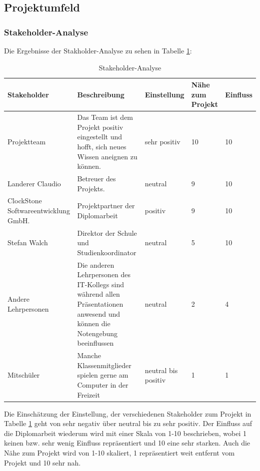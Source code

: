 \subsection{Projektumfeld}
\def \currentAuthor {Lukas Vogel} %
\subsubsection{Stakeholder-Analyse}
Die Ergebnisse der Stakholder-Analyse zu sehen in Tabelle \ref{Stakeholder-Analyse}:
\begin{table}[H]
		
	\renewcommand{\arraystretch}{1.5}
		\begin{tabular}{|p{3cm}|p{6cm}|p{3cm}|p{1.5cm}|p{1.5cm}|}
			\hline
			\textbf{Stakeholder} & \textbf{Beschreibung} & \textbf{Einstellung} & \textbf{Nähe zum Projekt} & \textbf{Einfluss} \\
			\hline
			Projektteam & Das Team ist dem Projekt positiv eingestellt und hofft, sich neues Wissen aneignen zu können. & sehr positiv & 10 & 10\\
			\hline
			Landerer Claudio & Betreuer des Projekts. & neutral & 9 &10\\
			\hline
			ClockStone Softwareentwicklung GmbH.& Projektpartner der Diplomarbeit & positiv & 9 & 10\\
			\hline
			Stefan Walch & Direktor der Schule und Studienkoordinator & neutral& 5 & 10\\
			\hline
			Andere Lehrpersonen & Die anderen Lehrpersonen des IT-Kollegs sind während allen Präsentationen anwesend und können die Notengebung beeinflussen & neutral& 2 & 4\\
			\hline
			Mitschüler & Manche Klassenmitglieder spielen gerne am Computer in der Freizeit	& neutral bis positiv & 1 & 1\\
			\hline
		\end{tabular}
\caption{Stakeholder-Analyse}
\label{Stakeholder-Analyse}
	\end{table}
Die Einschätzung der Einstellung, der verschiedenen Stakeholder zum Projekt in Tabelle \ref{Stakeholder-Analyse} geht von sehr negativ über neutral bis zu sehr positiv. Der Einfluss auf die Diplomarbeit wiederum wird mit einer Skala von 1-10 beschrieben, wobei 1 keinen bzw. sehr wenig Einfluss repräsentiert und 10 eine sehr starken. Auch die Nähe zum Projekt wird von 1-10 skaliert, 1 repräsentiert weit entfernt vom Projekt und 10 sehr nah.

